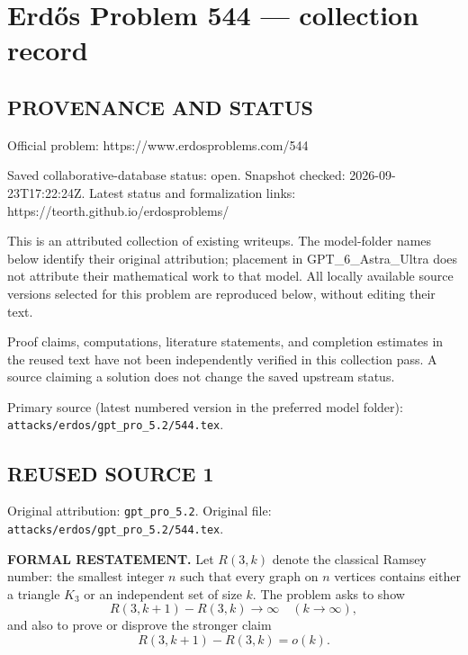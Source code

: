 \section*{Erd\H{o}s Problem 544 --- collection record}

\subsection*{PROVENANCE AND STATUS}
Official problem: https://www.erdosproblems.com/544

Saved collaborative-database status: open.
Snapshot checked: 2026-09-23T17:22:24Z.
Latest status and formalization links: https://teorth.github.io/erdosproblems/

This is an attributed collection of existing writeups. The model-folder names below identify their original attribution; placement in GPT\_6\_Astra\_Ultra does not attribute their mathematical work to that model. All locally available source versions selected for this problem are reproduced below, without editing their text.

Proof claims, computations, literature statements, and completion estimates in the reused text have not been independently verified in this collection pass. A source claiming a solution does not change the saved upstream status.

Primary source (latest numbered version in the preferred model folder): \texttt{attacks/erdos/gpt\_pro\_5.2/544.tex}.

\subsection*{REUSED SOURCE 1}
Original attribution: \texttt{gpt\_pro\_5.2}.
Original file: \texttt{attacks/erdos/gpt\_pro\_5.2/544.tex}.


\noindent\textbf{FORMAL RESTATEMENT.}
Let $R(3,k)$ denote the classical Ramsey number: the smallest integer $n$ such that every graph on $n$ vertices contains either a triangle $K_3$ or an independent set of size $k$.
The problem asks to show
\[
R(3,k+1)-R(3,k)\to\infty\quad (k\to\infty),
\]
and also to prove or disprove the stronger claim
\[
R(3,k+1)-R(3,k)=o(k).
\]

